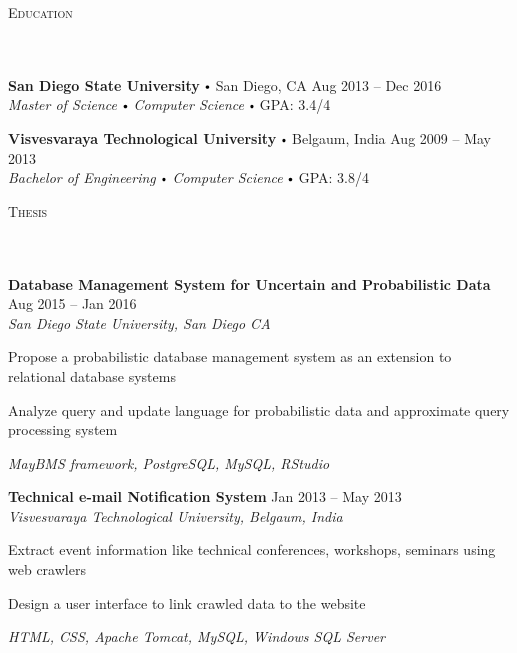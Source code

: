 \documentclass{article}
\newcommand{\header}[1]{{
\hspace*{-15pt}\vspace*{6pt} \textsc{#1}} \vspace*{-6pt} 
\lineunder
}
\newcommand{\lineunder}{
\vspace*{-8pt} \\ \hspace*{-18pt} 
\hrulefill \\
}
\newcommand{\school}[4]{
\textbf{#1} \labelitemi #2 \hfill #3 \\ #4 \vspace*{5pt}
}
\newcommand{\project}[4]{{
\vspace*{2pt}%
\textbf{#1} #2 \hfill #3\\ \textit{#4} \vspace*{2pt}}
}
\renewcommand{\labelitemi}{
$\vcenter{\hbox{\tiny$\bullet$}}$\hspace*{3pt}
}
\renewcommand{\labelitemii}{
$\vcenter{\hbox{\tiny$\bullet$}}$\hspace*{-3pt}
}
\newenvironment{bullet-list-minor}{
\begin{list}{\labelitemii}{\setlength\leftmargin{15pt} 
\topsep 0pt \itemsep -2pt}}{\vspace*{4pt}\end{list}
}
\begin{document}
{\header{Education}
    \school{San Diego State University}{San Diego, CA}{Aug 2013 -- Dec 2016}
    {\textit{Master of Science \labelitemi Computer Science}\labelitemi GPA: 3.4/4}

    \school{Visvesvaraya Technological University}{Belgaum, India}{Aug 2009 -- May 2013}
    {\textit{Bachelor of Engineering \labelitemi Computer Science}\labelitemi GPA: 3.8/4}


   \vspace*{4pt}%
   
\header{Thesis}
    \project{Database Management System for Uncertain and Probabilistic Data}{ }{Aug 2015 -- Jan 2016}{San Diego State University, San Diego CA}
	\begin{bullet-list-minor}
    \item Propose a probabilistic database management system as an extension to relational database systems
    \item Analyze query and update language for probabilistic data and approximate query processing system
	
	\textit{MayBMS framework, PostgreSQL, MySQL, RStudio}
	\end{bullet-list-minor}
	
	\project{Technical e-mail Notification System}{}{Jan 2013 -- May 2013}{Visvesvaraya Technological University, Belgaum, India}
	\begin{bullet-list-minor}
	\item Extract event information like technical conferences, workshops, seminars using web crawlers
	\item Design a user interface to link crawled data to the website
	
	\textit{HTML, CSS, Apache Tomcat, MySQL, Windows SQL Server}
	
	\end{bullet-list-minor}

}
\end{document}
